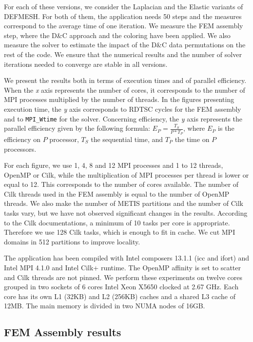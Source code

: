 \documentclass[10pt]{IOS-Book-Article}
\begin{document}
For each of these versions, we consider the Laplacian and the Elastic variants of DEFMESH.
For both of them, the application needs 50 steps and the measures correspond to the average time of one iteration.
We measure the FEM assembly step, where the D\&C approach and the coloring have been applied.
We also measure the solver to estimate the impact of the D\&C data permutations on the rest of the code.
We ensure that the numerical results and the number of solver iterations needed to converge are stable in all versions.

We present the results both in terms of execution times and of parallel efficiency.
When the  \emph{x} axis represents the number of cores, it corresponds to the number of MPI processes multiplied by the number of threads.
In the figures presenting execution time, the \emph{y} axis corresponds to RDTSC cycles for the FEM assembly and to \texttt{MPI\_Wtime} for the solver.
Concerning efficiency, the \emph{y} axis represents the parallel efficiency given by the following formula:
$E_{P} = \frac{T_{S}}{P*T_{P}}$, where $E_{P}$ is the efficiency on $P$ processor, $T_{S}$ the sequential time, and $T_{P}$ the time on $P$ processors.

For each figure, we use 1, 4, 8 and 12 MPI processes and 1 to 12 threads, OpenMP or Cilk, while the multiplication of MPI processes per thread is lower or equal to 12.
This corresponds to the number of cores available. The number of Cilk threads used in the FEM assembly is equal to the number of OpenMP threads.
We also make the number of METIS partitions and the number of Cilk tasks vary, but we have not observed significant changes in the results.
According to the Cilk documentations, a minimum of 10 tasks per core is appropriate. Therefore we use 128 Cilk tasks, which is enough to fit in cache.
We cut MPI domains in 512 partitions to improve locality.

The application has been compiled with Intel composers 13.1.1 (icc and ifort) and Intel MPI 4.1.0 and Intel Cilk+ runtime. The OpenMP affinity is set to scatter and Cilk threads are not pinned.
We perform these experiments on twelve cores grouped in two sockets of 6 cores Intel Xeon X5650 clocked at 2.67 GHz.
Each core has its own L1 (32KB) and L2 (256KB) caches and a shared L3 cache of 12MB. The main memory is divided in two NUMA nodes of 16GB.

\subsection{FEM Assembly results}
\end{document}
